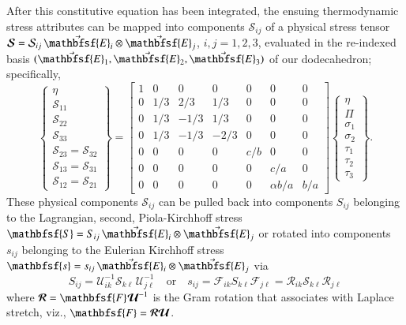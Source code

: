 After this constitutive equation has been integrated, the ensuing thermo\-dynamic stress attributes can be mapped into components $\mathcal{S}_{ij}$ of a physical stress tensor $\boldsymbol{\mathcal{S}} = \mathcal{S}_{ij} \, \vec{\mathbfsf{E}}_i \otimes \vec{\mathbfsf{E}}_j$, $i, j = 1, 2, 3$, evaluated in the re-indexed basis $( \vec{\mathbfsf{E}}_1 , \vec{\mathbfsf{E}}_2 , \vec{\mathbfsf{E}}_3 )$ of our dodecahedron; specifically,
\begin{equation}
\left\{ \begin{matrix}
\eta \\ \mathcal{S}_{11} \\ \mathcal{S}_{22} \\ \mathcal{S}_{33} \\
\mathcal{S}_{23} = \mathcal{S}_{32} \\
\mathcal{S}_{13} = \mathcal{S}_{31} \\
\mathcal{S}_{12} = \mathcal{S}_{21}
\end{matrix} \right\} = \begin{bmatrix}
1 & 0 & 0 & 0 & 0 & 0 & 0 \\
0 & 1/3 & 2/3 & 1/3 & 0 & 0 & 0 \\
0 & 1/3 & -1/3 & 1/3 & 0 & 0 & 0 \\
0 & 1/3 & -1/3 & -2/3 & 0 & 0 & 0 \\
0 & 0 & 0 & 0 & c/b & 0 & 0 \\
0 & 0 & 0 & 0 & 0 & c/a & 0 \\
0 & 0 & 0 & 0 & 0 & \alpha b/a & b/a
\end{bmatrix}
\left\{ \begin{matrix}
\eta \\ \Pi \\ \sigma_1 \\ \sigma_2 \\ \tau_1 \\ \tau_2 \\ \tau_3
\end{matrix} \right\} .
\end{equation}
These physical components $\mathcal{S}_{ij}$ can be pulled back into components $S_{ij}$ belonging to the Lagrangian, second, Piola-Kirchhoff stress $\mathbfsf{S} = S_{ij} \, \vec{\mathbfsf{E}}_i \otimes \vec{\mathbfsf{E}}_j$ or rotated into components $s_{ij}$ belonging to the Eulerian Kirchhoff stress $\mathbfsf{s} = s_{ij} \, \vec{\mathbfsf{E}}_i \otimes \vec{\mathbfsf{E}}_j$ via 
\begin{equation}
S_{ij} = \mathcal{U}^{-1}_{ik} \mathcal{S}_{k\ell\,} \mathcal{U}^{-1}_{j\ell}
\quad \text{or} \quad
s_{ij} = \mathcal{F}_{ik} S_{k\ell} \mathcal{F}_{j\ell} = 
\mathcal{R}_{ik} \mathcal{S}_{k\ell} \mathcal{R}_{j\ell}
\end{equation}
where $\boldsymbol{\mathcal{R}} = \mathbfsf{F} \hspace{0.5pt} \boldsymbol{\mathcal{U}}^{-1}$ is the Gram rotation that associates with Laplace stretch, viz., $\mathbfsf{F} = \boldsymbol{\mathcal{RU}}$.

